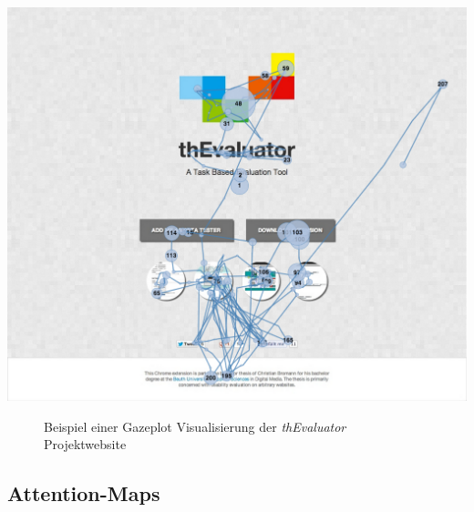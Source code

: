 \vspace{0.3cm}
\begin{center}
\includegraphics[scale=0.35]{./images/gazeplot}
\end{center}
\begin{figure}[htb]
   \centering
   \caption{Beispiel einer Gazeplot Visualisierung der \textit{thEvaluator} Projektwebsite}
    \label{gazeplot}
\end{figure}


\subsection{Attention-Maps}


